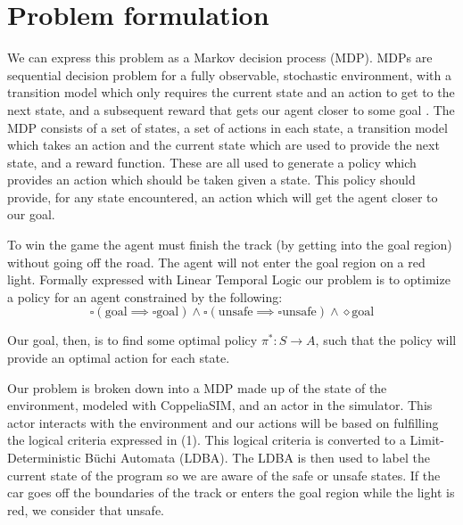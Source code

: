 \documentclass{article}
\begin{document}
\section{Problem formulation}
We can express this problem as a Markov decision process (MDP). MDPs are sequential decision problem for a fully observable, stochastic environment, with a transition model which only requires the current state and an action to get to the next state, and a subsequent reward that gets our agent closer to some goal \cite{russel2010}. The MDP consists of a set of states, a set of actions in each state, a transition model which takes an action and the current state which are used to provide the next state, and a reward function. These are all used to generate a policy which provides an action which should be taken given a state. This policy should provide, for any state encountered, an action which will get the agent closer to our goal.

To win the game the agent must finish the track (by getting into the goal region) without going off the road. The agent will not enter the goal region on a red light. Formally expressed with Linear Temporal Logic our problem is to optimize a policy for an agent constrained by the following:
\begin{equation}
    \square ( \text{goal} \implies \square \text{goal}) \wedge \square ( \text{unsafe} \implies \square \text{unsafe} ) \wedge \diamond \text{goal}
\end{equation}

Our goal, then, is to find some optimal policy $\pi^{*} : S \rightarrow A$, such that the policy will provide an optimal action for each state.

Our problem is broken down into a MDP made up of the state of the environment, modeled with CoppeliaSIM, and an actor in the simulator. This actor interacts with the environment and our actions will be based on fulfilling the logical criteria expressed in (1). This logical criteria is converted to a Limit-Deterministic Büchi Automata (LDBA). The LDBA is then used to label the current state of the program so we are aware of the safe or unsafe states. If the car goes off the boundaries of the track or enters the goal region while the light is red, we consider that unsafe.
\end{document}
